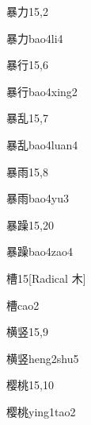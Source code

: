 \begin{entry}{暴力}{15,2}
  \begin{phonetics}{暴力}{bao4li4}
  \end{phonetics}
\end{entry}

\begin{entry}{暴行}{15,6}
  \begin{phonetics}{暴行}{bao4xing2}
  \end{phonetics}
\end{entry}

\begin{entry}{暴乱}{15,7}
  \begin{phonetics}{暴乱}{bao4luan4}
  \end{phonetics}
\end{entry}

\begin{entry}{暴雨}{15,8}
  \begin{phonetics}{暴雨}{bao4yu3}
  \end{phonetics}
\end{entry}

\begin{entry}{暴躁}{15,20}
  \begin{phonetics}{暴躁}{bao4zao4}
  \end{phonetics}
\end{entry}

\begin{entry}{槽}{15}[Radical ⽊]
  \begin{phonetics}{槽}{cao2}
  \end{phonetics}
\end{entry}

\begin{entry}{横竖}{15,9}
  \begin{phonetics}{横竖}{heng2shu5}
  \end{phonetics}
\end{entry}

\begin{entry}{樱桃}{15,10}
  \begin{phonetics}{樱桃}{ying1tao2}
  \end{phonetics}
\end{entry}


